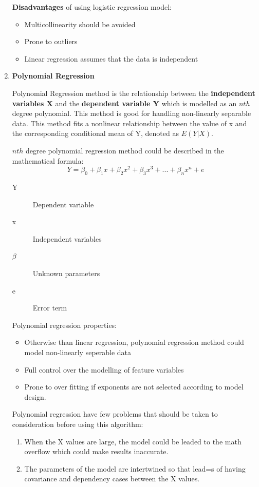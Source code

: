 \begin{enumerate}
    \textbf{Disadvantages} of using logistic regression model:
    
    \begin{itemize}
        \item Multicollinearity should be avoided
        \item Prone to outliers
        \item Linear regression assumes that the data is independent
    \end{itemize}
    
    \item \textbf{Polynomial Regression}
    
    Polynomial Regression method is the relationship between the \textbf{independent variables X } and the \textbf{dependent variable Y} which is modelled as an $nth$ degree polynomial. This method is good for handling non-linearly separable data. This method fits a nonlinear relationship between the value of x and the corresponding conditional mean of Y, denoted as $E(Y|X)$. 
    
    $nth$ degree polynomial regression method could be described in the mathematical formula:
    \begin{equation}
     Y = \beta_{0} + \beta_{1}x + \beta_{2}x^2 + \beta_{3}x^3 + ... + \beta_{n}x^n + e
    \end{equation}
    \begin{description}
        \item[Y] Dependent variable 
        \item[x] Independent variables
        \item[$\beta$] Unknown parameters
        \item[e] Error term
    \end{description}
    
    Polynomial regression properties:
    \begin{itemize}
        \item Otherwise than linear regression, polynomial regression method could model non-linearly seperable data
        \item Full control over the modelling of feature variables
        \item Prone to over fitting if exponents are not selected according to model design.
    \end{itemize}
    
    Polynomial regression have few problems that should be taken to consideration before using this algorithm:
    \begin{enumerate}
        \item When the X values are large, the model could be leaded to the math overflow which could make results inaccurate.
        \item The parameters of the model are intertwined so that lead=s of having covariance and dependency cases between the X values.
    \end{enumerate}
    

\end{enumerate}
